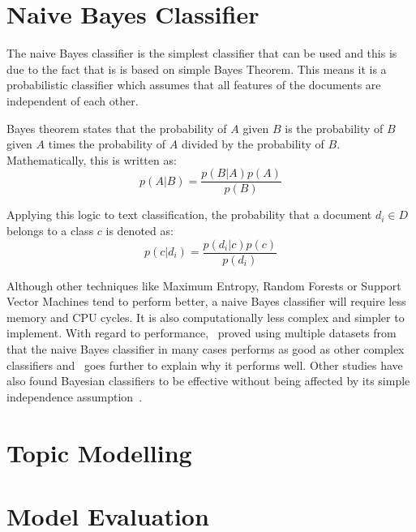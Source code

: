 \section{Naive Bayes Classifier}
\label{sec:bg_text_classification}
The naive Bayes classifier is the simplest classifier that can be used and this is due to the fact
that is is based on simple Bayes Theorem. This means it is a probabilistic classifier which
assumes that all features of the documents are independent of each other.

Bayes theorem states that the probability of $A$ given $B$ is the probability of $B$ given $A$ times
the probability of $A$ divided by the probability of $B$. Mathematically, this is written as:
\begin{equation}
  p(A|B) = \frac{p(B|A)p(A)}{p(B)}
\end{equation}

Applying this logic to text classification, the probability that a document $d_i \in D$ belongs to a
class $c$ is denoted as:
\begin{equation}
  p(c|d_i) = \frac{p(d_i|c)p(c)}{p(d_i)}
\end{equation}

Although other techniques like Maximum Entropy, Random Forests or Support Vector Machines tend to
perform better, a naive Bayes classifier will require less memory and CPU cycles. It is also
computationally less complex and simpler to implement. With regard to
performance,~\cite{huangLuLing2003} proved using multiple datasets from~\cite{blakeMerz1998} that
the naive Bayes classifier in many cases performs as good as other complex
classifiers and~\cite{zhang2004} goes further to explain why it performs well. Other studies have also
found Bayesian classifiers to be effective without being affected by its simple independence
assumption~\cite{langley1992analysis,manning2008}.

\section{Topic Modelling}
\label{sec:bg_topic_modelling}


\section{Model Evaluation}
\label{sec:bg_model_evaluation}

